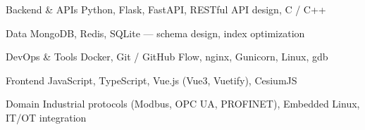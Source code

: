 

\begin{cvskills}

  \cvskill
    {Backend \& APIs} %
    {Python, Flask, FastAPI, RESTful API design, C / C++} %

  \cvskill
    {Data} %
    {MongoDB, Redis, SQLite --- schema design, index optimization} %

  \cvskill
    {DevOps \& Tools} %
    {Docker, Git / GitHub Flow, nginx, Gunicorn, Linux, gdb} %

  \cvskill
    {Frontend} %
    {JavaScript, TypeScript, Vue.js (Vue3, Vuetify), CesiumJS} %

  \cvskill
    {Domain} %
    {Industrial protocols (Modbus, OPC UA, PROFINET), Embedded Linux, IT/OT integration} %

\end{cvskills}
